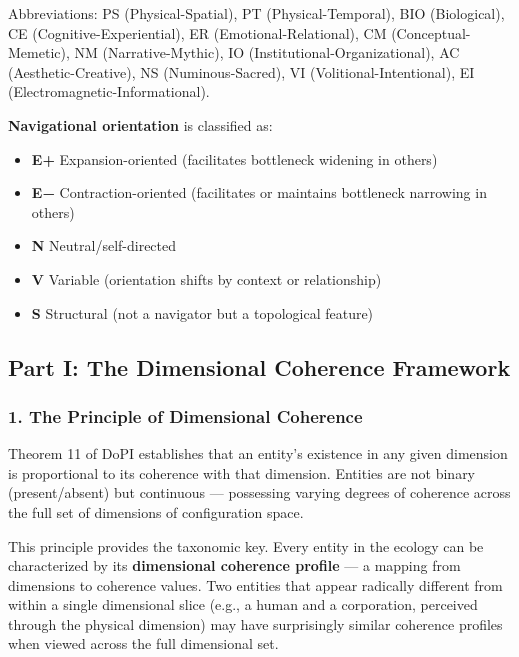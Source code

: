 Abbreviations: PS (Physical-Spatial), PT (Physical-Temporal), BIO (Biological), CE (Cognitive-Experiential), ER (Emotional-Relational), CM (Conceptual-Memetic), NM (Narrative-Mythic), IO (Institutional-Organizational), AC (Aesthetic-Creative), NS (Numinous-Sacred), VI (Volitional-Intentional), EI (Electromagnetic-Informational).


\textbf{Navigational orientation} is classified as:

\begin{itemize}[nosep,leftmargin=*]
  \item \textbf{E+} Expansion-oriented (facilitates bottleneck widening in others)
  \item \textbf{E−} Contraction-oriented (facilitates or maintains bottleneck narrowing in others)
  \item \textbf{N} Neutral/\allowbreak self-directed
  \item \textbf{V} Variable (orientation shifts by context or relationship)
  \item \textbf{S} Structural (not a navigator but a topological feature)
\end{itemize}


\bigskip\noindent\makebox[\textwidth]{\color{rulegray}\rule{5cm}{0.3pt}}\bigskip


\subsection*{Part I: The Dimensional Coherence Framework}


\subsubsection*{1. The Principle of Dimensional Coherence}


Theorem 11 of DoPI establishes that an entity's existence in any given dimension is proportional to its coherence with that dimension. Entities are not binary (present/\allowbreak absent) but continuous — possessing varying degrees of coherence across the full set of dimensions of configuration space.


This principle provides the taxonomic key. Every entity in the ecology can be characterized by its \textbf{dimensional coherence profile} — a mapping from dimensions to coherence values. Two entities that appear radically different from within a single dimensional slice (e.g., a human and a corporation, perceived through the physical dimension) may have surprisingly similar coherence profiles when viewed across the full dimensional set.


